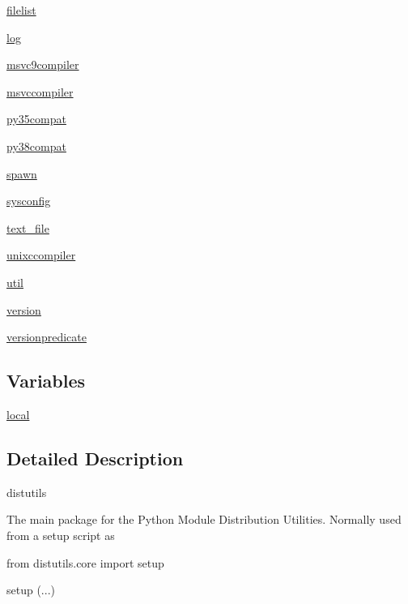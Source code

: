 \begin{DoxyCompactItemize}
\item 
 \hyperlink{namespacesetuptools_1_1__distutils_1_1filelist}{filelist}
\item 
 \hyperlink{namespacesetuptools_1_1__distutils_1_1log}{log}
\item 
 \hyperlink{namespacesetuptools_1_1__distutils_1_1msvc9compiler}{msvc9compiler}
\item 
 \hyperlink{namespacesetuptools_1_1__distutils_1_1msvccompiler}{msvccompiler}
\item 
 \hyperlink{namespacesetuptools_1_1__distutils_1_1py35compat}{py35compat}
\item 
 \hyperlink{namespacesetuptools_1_1__distutils_1_1py38compat}{py38compat}
\item 
 \hyperlink{namespacesetuptools_1_1__distutils_1_1spawn}{spawn}
\item 
 \hyperlink{namespacesetuptools_1_1__distutils_1_1sysconfig}{sysconfig}
\item 
 \hyperlink{namespacesetuptools_1_1__distutils_1_1text__file}{text\+\_\+file}
\item 
 \hyperlink{namespacesetuptools_1_1__distutils_1_1unixccompiler}{unixccompiler}
\item 
 \hyperlink{namespacesetuptools_1_1__distutils_1_1util}{util}
\item 
 \hyperlink{namespacesetuptools_1_1__distutils_1_1version}{version}
\item 
 \hyperlink{namespacesetuptools_1_1__distutils_1_1versionpredicate}{versionpredicate}
\end{DoxyCompactItemize}
\subsection*{Variables}
\begin{DoxyCompactItemize}
\item 
\hyperlink{namespacesetuptools_1_1__distutils_a2ab0d52b8e2fe00e3f0c4090963bdd30}{local}
\end{DoxyCompactItemize}


\subsection{Detailed Description}
\begin{DoxyVerb}distutils

The main package for the Python Module Distribution Utilities.  Normally
used from a setup script as

   from distutils.core import setup

   setup (...)
\end{DoxyVerb}
 


